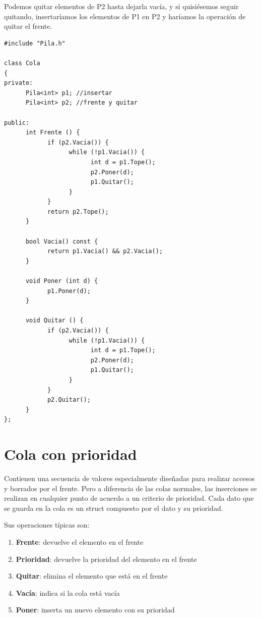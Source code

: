 \documentclass[10pt,a4paper,spanish]{report}
\begin{document}
\noindent
Podemos quitar elementos de P2 hasta dejarla vacía, y si quisiésemos seguir quitando, insertaríamos los elementos de P1 en P2 y haríamos la operación de quitar el frente.

\begin{verbatim}
#include "Pila.h"

class Cola
{
private:
      Pila<int> p1; //insertar
      Pila<int> p2; //frente y quitar

public:
      int Frente () {
            if (p2.Vacia()) {
                  while (!p1.Vacia()) {
                        int d = p1.Tope();
                        p2.Poner(d);
                        p1.Quitar();
                  }
            }
            return p2.Tope();
      }

      bool Vacia() const {
            return p1.Vacia() && p2.Vacia();
      }

      void Poner (int d) {
            p1.Poner(d);
      }

      void Quitar () {
            if (p2.Vacia()) {
                  while (!p1.Vacia()) {
                        int d = p1.Tope();
                        p2.Poner(d);
                        p1.Quitar();
                  }
            }
            p2.Quitar();
      }
};
\end{verbatim}

\section{\textcolor[rgb]{0.2,0.5,0.5}Cola con prioridad}
\noindent
Contienen una secuencia de valores especialmente diseñadas para realizar accesos y borrados por el frente. Pero a diferencia de las colas normales, las inserciones se realizan en cualquier punto de acuerdo a un criterio de prioridad. Cada dato que se guarda en la cola es un struct compuesto por el dato y su prioridad.

\noindent
Sus operaciones típicas son:
\begin{enumerate}[$\spadesuit$]
\item \textbf{\textcolor[rgb]{0.2,0.5,0.5}{Frente}}: devuelve el elemento en el frente
\item \textbf{\textcolor[rgb]{0.2,0.5,0.5}{Prioridad}}: devuelve la prioridad del elemento en el frente
\item \textbf{\textcolor[rgb]{0.2,0.5,0.5}{Quitar}}: elimina el elemento que está en el frente
\item \textbf{\textcolor[rgb]{0.2,0.5,0.5}{Vacía}}: indica si la cola está vacía
\item \textbf{\textcolor[rgb]{0.2,0.5,0.5}{Poner}}: inserta un nuevo elemento con su prioridad
\end{enumerate}
\end{document}
